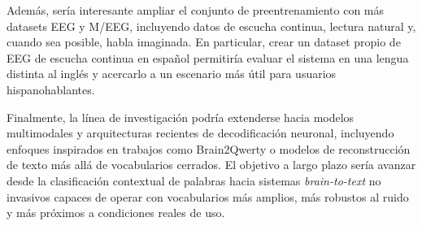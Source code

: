 Además, sería interesante ampliar el conjunto de preentrenamiento con más datasets EEG y M/EEG, incluyendo datos de escucha continua, lectura natural y, cuando sea posible, habla imaginada. En particular, crear un dataset propio de EEG de escucha continua en español permitiría evaluar el sistema en una lengua distinta al inglés y acercarlo a un escenario más útil para usuarios hispanohablantes.

Finalmente, la línea de investigación podría extenderse hacia modelos multimodales y arquitecturas recientes de decodificación neuronal, incluyendo enfoques inspirados en trabajos como Brain2Qwerty o modelos de reconstrucción de texto más allá de vocabularios cerrados. El objetivo a largo plazo sería avanzar desde la clasificación contextual de palabras hacia sistemas \textit{brain-to-text} no invasivos capaces de operar con vocabularios más amplios, más robustos al ruido y más próximos a condiciones reales de uso.

